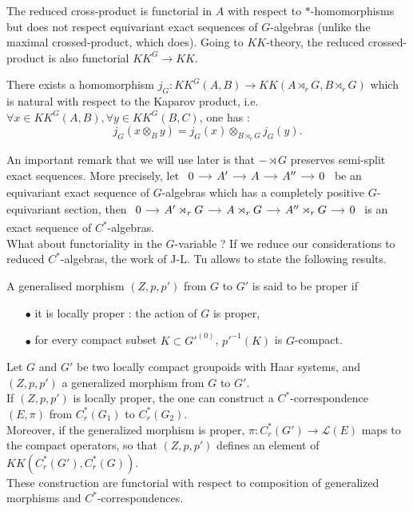 The reduced cross-product is functorial in $A$ with respect to $*$-homomorphisms but does not respect equivariant exact sequences of $G$-algebras (unlike the maximal crossed-product, which does). Going to $KK$-theory, the reduced crossed-product is also functorial $KK^G\rightarrow KK$.\\

\begin{prop}
There exists a homomorphism $j_G : KK^{G}(A,B)\rightarrow KK(A\rtimes_r G,B\rtimes_r G)$ which is natural with respect to the Kaparov product, i.e. $\forall x\in KK^G(A,B),\forall y\in KK^G(B,C)$, one has :
\[j_G(x\otimes_B y ) = j_G(x)\otimes_{B\rtimes_r G} j_G(y).\]
\end{prop}

An important remark that we will use later is that $- \rtimes G$ preserves semi-split exact sequences. More precisely, let 
$\begin{tikzcd}[column sep = small]
0\arrow{r} &  A'\arrow{r} &  A \arrow{r} &  A'' \arrow{r} & 0
\end{tikzcd}$
be an equivariant exact sequence of $G$-algebras which has a completely positive $G$-equivariant section, then
$\begin{tikzcd}[column sep = small]
0\arrow{r} &  A'\rtimes_r G \arrow{r} &  A\rtimes_r G \arrow{r} &  A''\rtimes_r G \arrow{r} & 0
\end{tikzcd}$ is an exact sequence of $C^*$-algebras.\\

What about functoriality in the $G$-variable ? If we reduce our considerations to reduced $C^*$-algebras, the work of J-L. Tu \cite{TuNonHaus} allows to state the following results.\\

\begin{definition}
A generalised morphism $(Z,p,p')$ from $G$ to $G'$ is said to be proper if 
\begin{itemize}
\item[$\bullet$] it is locally proper : the action of $G$ is proper,
\item[$\bullet$] for every compact subset $K\subset G'^{(0)}$, $p'^{-1}(K)$ is $G$-compact.
\end{itemize}
\end{definition}

\begin{prop}
Let $G$ and $G'$ be two locally compact groupoids with Haar systems, and $(Z,p,p')$ a generalized morphism from $G$ to $G'$. \\
If $(Z,p,p')$ is locally proper, the one can construct a $C^*$-correspondence $(E,\pi)$ from $C_r^*(G_1)$ to $C^*_r(G_2)$. \\
Moreover, if the generalized morphism is proper, $\pi : C^*_r(G')\rightarrow \mathcal L(E)$ maps to the compact operators, so that $(Z,p,p')$ defines an element of $KK(C_r^*(G'),C_r^*(G))$.\\
These construction are functorial with respect to composition of generalized morphisms and $C^*$-correspondences.\\ 
\end{prop}

